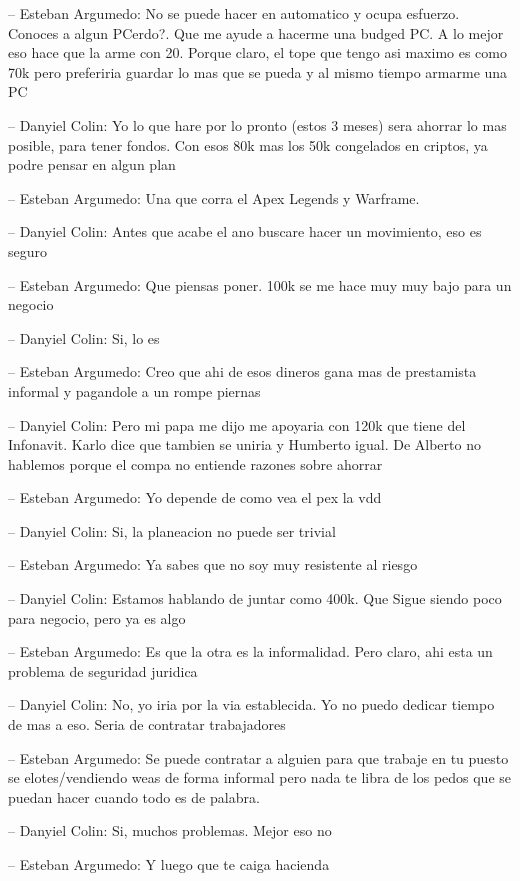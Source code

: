 -- Esteban Argumedo: No se puede hacer en automatico y ocupa esfuerzo.
Conoces a algun PCerdo?. Que me ayude a hacerme una budged PC. A lo
mejor eso hace que la arme con 20. Porque claro, el tope que tengo asi
maximo es como 70k pero preferiria guardar lo mas que se pueda y al
mismo tiempo armarme una PC

-- Danyiel Colin: Yo lo que hare por lo pronto (estos 3 meses) sera
ahorrar lo mas posible, para tener fondos. Con esos 80k mas los 50k
congelados en criptos, ya podre pensar en algun plan

-- Esteban Argumedo: Una que corra el Apex Legends y Warframe.

-- Danyiel Colin: Antes que acabe el ano buscare hacer un movimiento,
eso es seguro

-- Esteban Argumedo: Que piensas poner. 100k se me hace muy muy bajo
para un negocio

-- Danyiel Colin: Si, lo es

-- Esteban Argumedo: Creo que ahi de esos dineros gana mas de
prestamista informal y pagandole a un rompe piernas

-- Danyiel Colin: Pero mi papa me dijo me apoyaria con 120k que tiene
del Infonavit. Karlo dice que tambien se uniria y Humberto igual. De
Alberto no hablemos porque el compa no entiende razones sobre ahorrar

-- Esteban Argumedo: Yo depende de como vea el pex la vdd

-- Danyiel Colin: Si, la planeacion no puede ser trivial

-- Esteban Argumedo: Ya sabes que no soy muy resistente al riesgo

-- Danyiel Colin: Estamos hablando de juntar como 400k. Que Sigue siendo
poco para negocio, pero ya es algo

-- Esteban Argumedo: Es que la otra es la informalidad. Pero claro, ahi
esta un problema de seguridad juridica

-- Danyiel Colin: No, yo iria por la via establecida. Yo no puedo
dedicar tiempo de mas a eso. Seria de contratar trabajadores

-- Esteban Argumedo: Se puede contratar a alguien para que trabaje en tu
puesto se elotes/vendiendo weas de forma informal pero nada te libra de
los pedos que se puedan hacer cuando todo es de palabra.

-- Danyiel Colin: Si, muchos problemas. Mejor eso no

-- Esteban Argumedo: Y luego que te caiga hacienda

